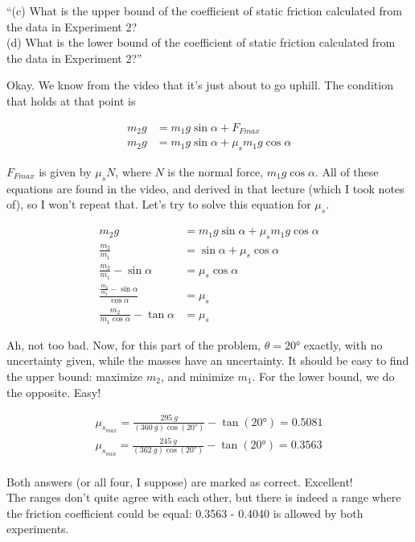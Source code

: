 \documentclass[12pt,a4paper]{report}
\begin{document}
``(c) What is the upper bound of the coefficient of static friction calculated from the data in Experiment 2?\\
(d) What is the lower bound of the coefficient of static friction calculated from the data in Experiment 2?''

Okay. We know from the video that it's just about to go uphill. The condition that holds at that point is

\begin{align}
m_2 g &= m_1 g \sin \alpha + F_{Fmax}\\
m_2 g &= m_1 g \sin \alpha + \mu_s m_1 g \cos \alpha
\end{align}

$F_{Fmax}$ is given by $\mu_s N$, where $N$ is the normal force, $m_1 g \cos \alpha$. All of these equations are found in the video, and derived in that lecture (which I took notes of), so I won't repeat that. Let's try to solve this equation for $\mu_s$.

\begin{align}
m_2 g &= m_1 g \sin \alpha + \mu_s m_1 g \cos \alpha\\
\frac{m_2}{m_1} &= \sin \alpha + \mu_s \cos \alpha\\
\frac{m_2}{m_1} - \sin \alpha &= \mu_s \cos \alpha\\
\frac{\frac{m_2}{m_1} - \sin \alpha}{\cos \alpha} &= \mu_s\\
\frac{m_2}{m_1 \cos \alpha} - \tan \alpha &= \mu_s
\end{align}

Ah, not too bad. Now, for this part of the problem, $\theta = \ang{20}$ exactly, with no uncertainty given, while the masses have an uncertainty. It should be easy to find the upper bound: maximize $m_2$, and minimize $m_1$. For the lower bound, we do the opposite. Easy!

\begin{align}
\mu_{s_{max}} = \frac{\SI{295}{g}}{(\SI{360}{g}) \cos(\ang{20})} - \tan(\ang{20}) = 0.5081\\
\mu_{s_{min}} = \frac{\SI{245}{g}}{(\SI{362}{g}) \cos(\ang{20})} - \tan(\ang{20}) = 0.3563\\
\end{align}

Both answers (or all four, I suppose) are marked as correct. Excellent!\\
The ranges don't quite agree with each other, but there is indeed a range where the friction coefficient could be equal: 0.3563 - 0.4040 is allowed by both experiments.
\end{document}
